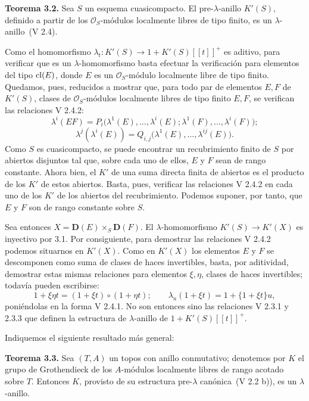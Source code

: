 \textbf{Teorema 3.2.} Sea \(S\) un esquema cuasicompacto. El pre-\(\lambda\)-anillo \(K'(S)\), definido a partir de los \(\mathcal O_S\)-módulos localmente libres de tipo finito, es un \(\lambda\)-anillo~(V 2.4).

Como el homomorfismo \(\lambda_t:K'(S)\longrightarrow 1+K'(S)[[t]]^+\) es aditivo, para verificar que es un \(\lambda\)-homomorfismo basta efectuar la verificación para elementos del tipo \(\operatorname{cl}(E)\), donde \(E\) es un \(\mathcal O_S\)-módulo localmente libre de tipo finito. Quedamos, pues, reducidos a mostrar que, para todo par de elementos \(E,F\) de \(K'(S)\), clases de \(\mathcal O_S\)-módulos localmente libres de tipo finito \(E,F\), se verifican las relaciones V 2.4.2:
\[
  \lambda^i(EF)=P_i\bigl(\lambda^1(E),\ldots,\lambda^i(E);\lambda^1(F),\ldots,\lambda^i(F)\bigr);
\]
\[
  \lambda^j(\lambda^i(E))=Q_{i,j}\bigl(\lambda^1(E),\ldots,\lambda^{ij}(E)\bigr).
\]
Como \(S\) es cuasicompacto, se puede encontrar un recubrimiento finito de \(S\) por abiertos disjuntos tal que, sobre cada uno de ellos, \(E\) y \(F\) sean de rango constante. Ahora bien, el \(K'\) de una suma directa finita de abiertos es el producto de los \(K'\) de estos abiertos. Basta, pues, verificar las relaciones V 2.4.2 en cada uno de los \(K'\) de los abiertos del recubrimiento. Podemos suponer, por tanto, que \(E\) y \(F\) son de rango constante sobre \(S\).

Sea entonces \(X=\mathbf D(E)\times_S \mathbf D(F)\). El \(\lambda\)-homomorfismo \(K'(S)\to K'(X)\) es inyectivo por 3.1. Por consiguiente, para demostrar las relaciones V 2.4.2 podemos situarnos en \(K'(X)\). Como en \(K'(X)\) los elementos \(E\) y \(F\) se descomponen como suma de clases de haces invertibles, basta, por aditividad, demostrar estas mismas relaciones para elementos \(\xi,\eta\), clases de haces invertibles; todavía pueden escribirse:
\[
  1+\xi\eta t=(1+\xi t)\circ(1+\eta t);
  \qquad
  \lambda_u(1+\xi t)=1+\{1+\xi t\}u,
\]
poniéndolas en la forma V 2.4.1. No son entonces sino las relaciones V 2.3.1 y 2.3.3 que definen la estructura de \(\lambda\)-anillo de \(1+K'(S)[[t]]^+\).

Indiquemos el siguiente resultado más general:

\textbf{Teorema 3.3.} Sea \((T,A)\) un topos con anillo conmutativo; denotemos por \(K\) el grupo de Grothendieck de los \(A\)-módulos localmente libres de rango acotado sobre \(T\). Entonces \(K\), provisto de su estructura pre-\(\lambda\) canónica~(V 2.2 b)), es un \(\lambda\)-anillo.

